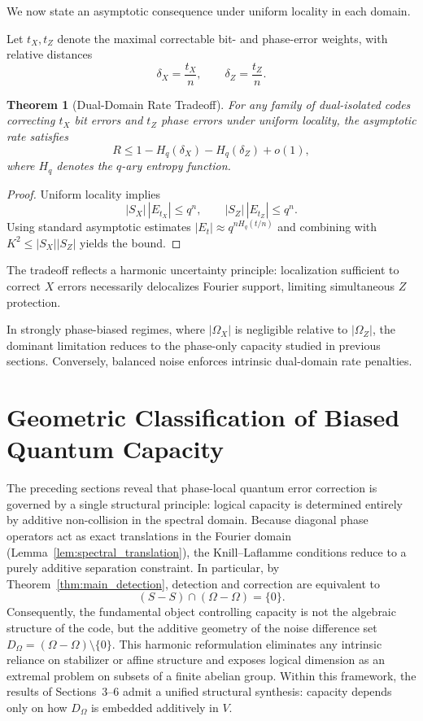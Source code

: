 \documentclass[a4paper,twocolumn,11pt,allowtoday]{quantumarticle}
\theoremstyle{plain}
\newtheorem{theorem}{Theorem}[section]
\theoremstyle{definition}
\theoremstyle{remark}
\begin{document}
We now state an asymptotic consequence
under uniform locality in each domain.

Let $t_X,t_Z$ denote the maximal correctable
bit- and phase-error weights,
with relative distances
\[
\delta_X = \frac{t_X}{n},
\qquad
\delta_Z = \frac{t_Z}{n}.
\]

\begin{theorem}[Dual-Domain Rate Tradeoff]
\label{thm:rate_tradeoff}
For any family of dual-isolated codes correcting
$t_X$ bit errors and $t_Z$ phase errors under
uniform locality,
the asymptotic rate satisfies
\[
R
\le
1 - H_q(\delta_X) - H_q(\delta_Z)
+ o(1),
\]
where $H_q$ denotes the $q$-ary entropy function.
\end{theorem}

\begin{proof}
Uniform locality implies
\[
|S_X|\,|E_{t_X}| \le q^n,
\qquad
|S_Z|\,|E_{t_Z}| \le q^n.
\]
Using standard asymptotic estimates
$|E_{t}| \approx q^{n H_q(t/n)}$
and combining with
$K^2 \le |S_X||S_Z|$
yields the bound.
\end{proof}

The tradeoff reflects a harmonic uncertainty principle:
localization sufficient to correct $X$ errors
necessarily delocalizes Fourier support,
limiting simultaneous $Z$ protection.

\medskip

In strongly phase-biased regimes,
where $|\Omega_X|$ is negligible relative to $|\Omega_Z|$,
the dominant limitation reduces to the
phase-only capacity studied in previous sections.
Conversely, balanced noise enforces intrinsic
dual-domain rate penalties.


\section{Geometric Classification of Biased Quantum Capacity}
\label{sec:discussion}

The preceding sections reveal that phase-local quantum error correction is governed by a single structural principle: logical capacity is determined entirely by additive non-collision in the spectral domain. Because diagonal phase operators act as exact translations in the Fourier domain (Lemma~\ref{lem:spectral_translation}), the Knill--Laflamme conditions reduce to a purely additive separation constraint. In particular, by Theorem~\ref{thm:main_detection}, detection and correction are equivalent to
\[
(S - S)\cap(\Omega - \Omega)=\{0\}.
\]
Consequently, the fundamental object controlling capacity is not the algebraic structure of the code, but the additive geometry of the noise difference set \(D_\Omega = (\Omega-\Omega)\setminus\{0\}\). This harmonic reformulation eliminates any intrinsic reliance on stabilizer or affine structure and exposes logical dimension as an extremal problem on subsets of a finite abelian group. Within this framework, the results of Sections~3–6 admit a unified structural synthesis: capacity depends only on how $D_\Omega$ is embedded additively in $V$.
\end{document}
